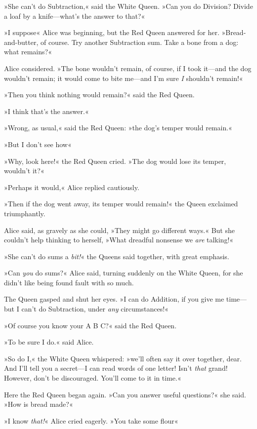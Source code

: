 »She can't do Subtraction,« said the White Queen. »Can you do Division? Divide a loaf by a knife—what's the answer to that?«

»I suppose\longdash« Alice was beginning, but the Red Queen answered for her. »Bread-and-butter, of course. Try another Subtraction sum. Take a bone from a dog: what remains?«

Alice considered. »The bone wouldn't remain, of course, if I took it—and the dog wouldn't remain; it would come to bite me—and I'm sure \textit{I} shouldn't remain!«

»Then you think nothing would remain?« said the Red Queen.

»I think that's the answer.«

»Wrong, as usual,« said the Red Queen: »the dog's temper would remain.«

»But I don't see how\longdash«

»Why, look here!« the Red Queen cried. »The dog would lose its temper, wouldn't it?«

»Perhaps it would,« Alice replied cautiously.

»Then if the dog went away, its temper would remain!« the Queen exclaimed triumphantly.

Alice said, as gravely as she could, »They might go different ways.« But she couldn't help thinking to herself, »What dreadful nonsense we \textit{are} talking!«

»She can't do sums a \textit{bit!}« the Queens said together, with great emphasis.

»Can \textit{you} do sums?« Alice said, turning suddenly on the White Queen, for she didn't like being found fault with so much.

The Queen gasped and shut her eyes. »I can do Addition, if you give me time—but I can't do Subtraction, under \textit{any} circumstances!«

»Of course you know your A B C?« said the Red Queen.

»To be sure I do.« said Alice.

»So do I,« the White Queen whispered: »we'll often say it over together, dear. And I'll tell you a secret—I can read words of one letter! Isn't \textit{that} grand! However, don't be discouraged. You'll come to it in time.«

Here the Red Queen began again. »Can you answer useful questions?« she said. »How is bread made?«

»I know \textit{that!}« Alice cried eagerly. »You take some flour\longdash«

